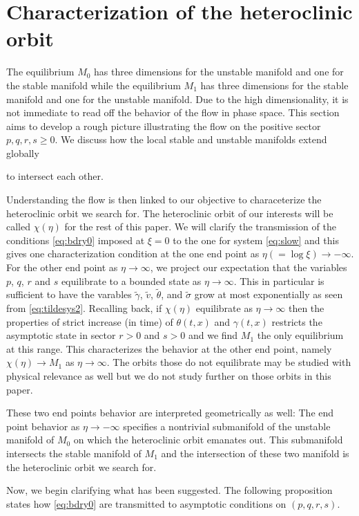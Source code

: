 \documentclass[a4paper,11pt]{article}
\def\blue{\color{blue}}
\def\tg{{\tilde{\gamma}}}
\def\tv{{\tilde{v}}}
\def\tth{{\tilde{\theta}}}
\def\ts{{\tilde{\sigma}}}
\theoremstyle{remark}
\begin{document}
\section{Characterization of the heteroclinic orbit} \label{sec:char}
The equilibrium $M_0$ has three dimensions for the unstable manifold and one for the stable manifold while the equilibrium $M_1$ has three dimensions for the 
stable manifold and one for the unstable manifold. Due to the high dimensionality, it is not immediate to read off the behavior 
of the flow in phase space. This section aims to develop a rough picture illustrating the flow on the positive sector $p,q,r,s \ge0$. 
We discuss how the local stable and unstable manifolds extend globally {\blue to intersect each other. 

Understanding the flow is then linked to our objective to characeterize the heteroclinic orbit we search for. The heteroclinic orbit of our interests will be called $\chi(\eta)$ for the rest of this paper. We will clarify the transmission of the conditions \eqref{eq:bdry0} imposed at $\xi=0$ to the one for system \eqref{eq:slow} and this gives one characterization condition at the one end point as $\eta(=\log\xi) \rightarrow -\infty$. For the other end point as $\eta \rightarrow \infty$, we project our expectation that the variables $p$, $q$, $r$ and $s$ equilibrate to a bounded state as $\eta \rightarrow \infty$. This in particular is sufficient to have the varables $\tg$, $\tv$, $\tth$, and $\ts$ grow at most exponentially as seen from \eqref{eq:tildesys2}. Recalling back, if $\chi(\eta)$ equilibrate as $\eta \rightarrow \infty$ then the properties of strict increase (in time) of  $\theta(t,x)$ and $\gamma(t,x)$ restricts the asymptotic state in sector $r>0$ and $s>0$ and we find $M_1$ the only equilibrium at this range. This characterizes the behavior at the other end point, namely $\chi(\eta) \rightarrow M_1$ as $\eta \rightarrow \infty$. The orbits those do not equilibrate may be studied with physical relevance as well but we do not study further on those orbits in this paper. 

These two end points behavior are interpreted geometrically as well: The end point behavior as $\eta \rightarrow -\infty$ specifies a nontrivial submanifold of the unstable manifold of $M_0$ on which the heteroclinic orbit emanates out. This submanifold intersects the stable manifold of $M_1$ and the intersection of these two manifold is the heteroclinic orbit we search for. 

Now, we begin clarifying what has been suggested. The following proposition states how \eqref{eq:bdry0} are transmitted to asymptotic conditions on $(p,q,r,s)$.
}
\end{document}
